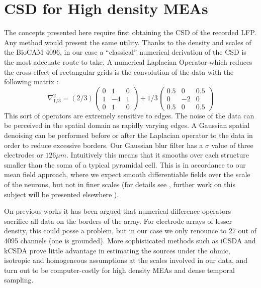 \documentclass{article}
\begin{document}
\section{CSD for High density MEAs}

The concepts presented here require first obtaining the CSD of the recorded LFP. Any method would present the same utility. Thanks to the density and scales of the BioCAM 4096, in our case a ``classical'' numerical derivation of the CSD is the most adecuate route to take. A numerical Laplacian Operator which reduces the cross effect of rectangular grids is the convolution of the data with the following matrix \cite{Lindberg90}:
\begin{equation}
\nabla^2_{1/3}=(2/3)
\begin{pmatrix}
  0 & 1 & 0 \\
  1 & -4 & 1 \\
  0 & 1 & 0
\end{pmatrix}
+1/3
\begin{pmatrix}
  0.5 & 0 & 0.5 \\
  0 & -2 & 0 \\
  0.5 & 0 & 0.5
\end{pmatrix}  
\end{equation}
This sort of operators are extremely sensitive to edges. The noise of the data can be perceived in the spatial domain as rapidly varying edges. A Gaussian spatial denoising can be performed before or after the Laplacian operator to the data in order to reduce excessive borders. Our Gaussian blur filter has a $\sigma$ value of three electrodes or $126 \mu m$. Intuitively this means that it smooths over each structure smaller than the soma of a typical pyramidal cell. 
This is  in accordance to our mean field approach, where we expect smooth differentiable fields over the scale of the neurons, but not in finer scales (for details see \cite{Bedard11}, further work on this subject will be presented elsewhere \cite{IsabelYo}).

On previous works it has been argued that numerical difference operators sacrifice all data on the borders of the array. For electrode arrays of lesser density, this could posse a problem, but in our case we only renounce to 27 out of 4095 channels (one is grounded). More sophisticated methods such as iCSDA \cite{Leski2011} and kCSDA \cite{Potworowski2011} prove little advantage in estimating the sources under the ohmic, isotropic and homogeneous assumptions at the scales involved in our data, and turn out to be computer-costly for high density MEAs and dense temporal sampling.  
\end{document}
